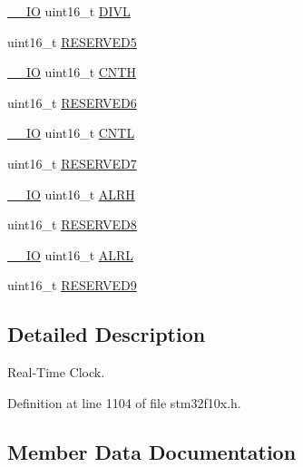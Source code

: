 \begin{DoxyCompactItemize}
\item 
\hyperlink{core__sc300_8h_aec43007d9998a0a0e01faede4133d6be}{\+\_\+\+\_\+\+IO} uint16\+\_\+t \hyperlink{struct_r_t_c___type_def_ad0c75a7cc4e925da0faedcd8860cb43a}{D\+I\+VL}
\item 
uint16\+\_\+t \hyperlink{struct_r_t_c___type_def_a052c02494c2dde3f74ff7d8987ee5230}{R\+E\+S\+E\+R\+V\+E\+D5}
\item 
\hyperlink{core__sc300_8h_aec43007d9998a0a0e01faede4133d6be}{\+\_\+\+\_\+\+IO} uint16\+\_\+t \hyperlink{struct_r_t_c___type_def_a094741bcc8fca018b500f7468531f0ef}{C\+N\+TH}
\item 
uint16\+\_\+t \hyperlink{struct_r_t_c___type_def_a74bdff4226786261b4c18b63dd21e3bd}{R\+E\+S\+E\+R\+V\+E\+D6}
\item 
\hyperlink{core__sc300_8h_aec43007d9998a0a0e01faede4133d6be}{\+\_\+\+\_\+\+IO} uint16\+\_\+t \hyperlink{struct_r_t_c___type_def_a212cb62d18ce312bc3f69641aa76688d}{C\+N\+TL}
\item 
uint16\+\_\+t \hyperlink{struct_r_t_c___type_def_abb8597ac192c0d24ab6b13b031a34d37}{R\+E\+S\+E\+R\+V\+E\+D7}
\item 
\hyperlink{core__sc300_8h_aec43007d9998a0a0e01faede4133d6be}{\+\_\+\+\_\+\+IO} uint16\+\_\+t \hyperlink{struct_r_t_c___type_def_a873ee28923e732677a3a58971bdc9e6b}{A\+L\+RH}
\item 
uint16\+\_\+t \hyperlink{struct_r_t_c___type_def_a5b09d77c801dc948581ef113d8a352c9}{R\+E\+S\+E\+R\+V\+E\+D8}
\item 
\hyperlink{core__sc300_8h_aec43007d9998a0a0e01faede4133d6be}{\+\_\+\+\_\+\+IO} uint16\+\_\+t \hyperlink{struct_r_t_c___type_def_afea5d3abb40323a5385cf461094c06d3}{A\+L\+RL}
\item 
uint16\+\_\+t \hyperlink{struct_r_t_c___type_def_a3f83ce9cfda0c0e7f854ab65347058b1}{R\+E\+S\+E\+R\+V\+E\+D9}
\end{DoxyCompactItemize}


\subsection{Detailed Description}
Real-\/\+Time Clock. 

Definition at line 1104 of file stm32f10x.\+h.



\subsection{Member Data Documentation}
\mbox{\label{struct_r_t_c___type_def_a873ee28923e732677a3a58971bdc9e6b}} 
